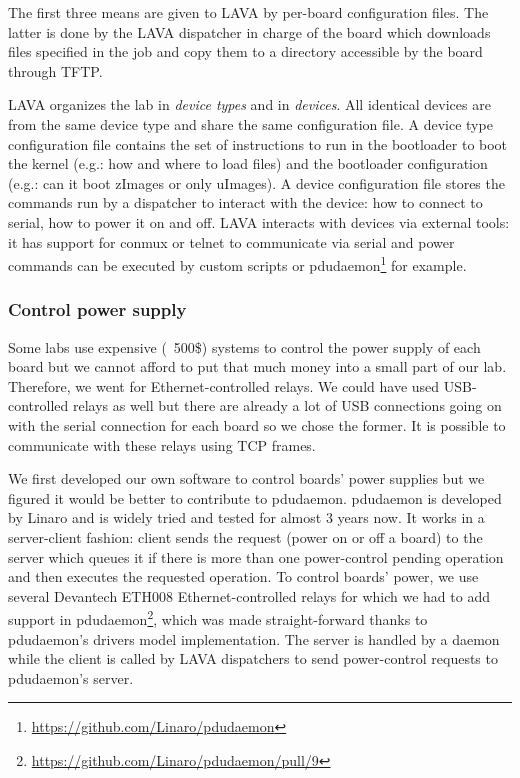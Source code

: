 The first three means are given to LAVA by per-board configuration files. The latter is done by the LAVA dispatcher in charge of the board which downloads files specified in the job and copy them to a directory accessible by the board through TFTP.

LAVA organizes the lab in \textit{device types} and in \textit{devices}. All identical devices are from the same device type and share the same configuration file. A device type configuration file contains the set of instructions to run in the bootloader to boot the kernel (e.g.: how and where to load files) and the bootloader configuration (e.g.: can it boot zImages or only uImages). A device configuration file stores the commands run by a dispatcher to interact with the device: how to connect to serial, how to power it on and off. LAVA interacts with devices via external tools: it has support for conmux or telnet to communicate via serial and power commands can be executed by custom scripts or pdudaemon\footnote{\url{https://github.com/Linaro/pdudaemon}} for example.

\subsubsection{Control power supply}

Some labs use expensive (~500\$) systems to control the power supply of each board but we cannot afford to put that much money into a small part of our lab. Therefore, we went for Ethernet-controlled relays. We could have used USB-controlled relays as well but there are already a lot of USB connections going on with the serial connection for each board so we chose the former. It is possible to communicate with these relays using TCP frames.

We first developed our own software to control boards' power supplies but we figured it would be better to contribute to pdudaemon. pdudaemon is developed by Linaro and is widely tried and tested for almost 3 years now. It works in a server-client fashion: client sends the request (power on or off a board) to the server which queues it if there is more than one power-control pending operation and then executes the requested operation. To control boards' power, we use several Devantech ETH008 Ethernet-controlled relays for which we had to add support in pdudaemon\footnote{\url{https://github.com/Linaro/pdudaemon/pull/9}}, which was made straight-forward thanks to pdudaemon's drivers model implementation. The server is handled by a daemon while the client is called by LAVA dispatchers to send power-control requests to pdudaemon's server.

